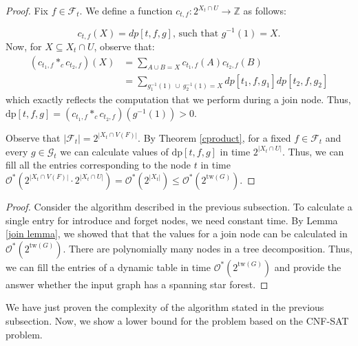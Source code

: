 \documentclass[en]{pracamgr}
\theoremstyle{definition}
\newcommand{\ssf}{spanning star forest}
\newcommand{\cnfsat}{{\sc CNF-SAT}}
\newcommand{\dpt}[1]{\textrm{dp}[#1]}
\newcommand{\tw}{\textrm{tw}}
\begin{document}
\begin{proof}
	Fix $f \in \mathcal{F}_t$. We define a function $c_{t,f}:2^{X_t \cap U} \rightarrow \mathbb{Z}$ as follows:
	
	\begin{equation*}
		c_{t,f}(X) = dp[t,f,g] \text{, such that $g^{-1}(1) = X$}.
	\end{equation*}	
	Now, for $X \subseteq X_t \cap U$, observe that: 
	\begin{align*}
		(c_{t_1,f} *_c c_{t_2,f})(X) &= \sum\limits_{A \cup B = X} c_{t_1,f}(A)c_{t_2,f}(B) \\
		&= \sum\limits_{ g_1^{-1}(1)\ \cup\ g_2^{-1}(1) = X} dp[t_1,f,g_1]dp[t_2,f,g_2]	
	\end{align*}
	which exactly reflects the computation that we perform during a join node. Thus, $\dpt{t,f,g} = (c_{t_1,f} *_c c_{t_2,f})(g^{-1}(1)) > 0$. 
	
	Observe that $|\mathcal{F}_t| = 2^{|X_t \cap V(F)|}$. By Theorem \ref{cproduct}, for a fixed $f \in \mathcal{F}_t$ and every $g \in \mathcal{G}_t$ we can calculate values of $\dpt{t,f,g}$ in time $2^{|X_t \cap U|}$. Thus, we can fill all the entries corresponding to the node $t$ in time $\mathcal{O}^*(2^{|X_t \cap V(F)|} \cdot 2^{|X_t \cap U|}) = \mathcal{O}^*(2^{|X_t|}) \leq \mathcal{O}^*(2^{\tw(G)})$.
\end{proof}

\thmssfeptwtime*

\begin{proof}
	Consider the algorithm described in the previous subsection. To calculate a single entry for introduce and forget nodes, we need constant time. By Lemma \ref{join lemma}, we showed that that the values for a join node can be calculated in $\mathcal{O}^*(2^{\tw(G)})$. There are polynomially many nodes in a tree decomposition. Thus, we can fill the entries of a dynamic table in time $\mathcal{O}^*(2^{\tw(G)})$ and provide the answer whether the input graph has a \ssf{}.
\end{proof}

We have just proven the complexity of the algorithm stated in the previous subsection. Now, we show a lower bound for the problem based on the \cnfsat{} problem.

\thmssfeptwseth*
\end{document}
